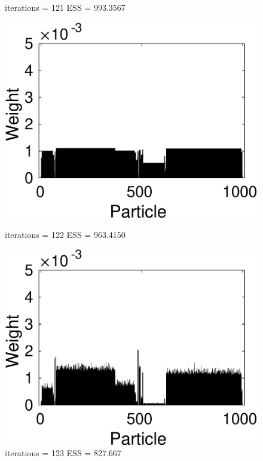 \documentclass[12pt]{article}
\begin{document}
\begin{figure}[h!]
\begin{minipage}{0.5\textwidth}
		\caption*{iterations = 121 ESS = 993.3567}
	\end{minipage}
	\begin{minipage}{0.5\textwidth}
		\centering
		\includegraphics[scale = 0.5]{./Figures/122.eps}
		\caption*{iterations = 122 ESS = 963.4150}
	\end{minipage}%
	\begin{minipage}{0.5\textwidth}
		\centering
		\includegraphics[scale = 0.5]{./Figures/123.eps}
		\caption*{iterations = 123 ESS = 827.667}
	\end{minipage}
	\begin{minipage}{0.5\textwidth}
		\centering

\end{minipage}
\end{figure}
\end{document}
